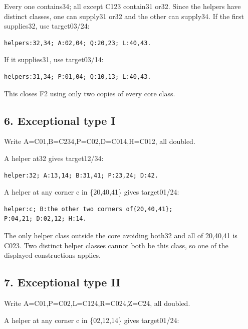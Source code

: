 \documentclass[
  10pt,
]{article}
\begin{document}
Every one contains34; all except C123 contain31 or32. Since the helpers
have distinct classes, one can supply31 or32 and the other can supply34.
If the first supplies32, use target03/24:

\begin{verbatim}
helpers:32,34; A:02,04; Q:20,23; L:40,43.
\end{verbatim}

If it supplies31, use target03/14:

\begin{verbatim}
helpers:31,34; P:01,04; Q:10,13; L:40,43.
\end{verbatim}

This closes F2 using only two copies of every core class.

\hypertarget{exceptional-type-i}{%
\subsection*{6. Exceptional type I}\label{exceptional-type-i}}

Write A=C01,B=C234,P=C02,D=C014,H=C012, all doubled.

A helper at32 gives target12/34:

\begin{verbatim}
helper:32; A:13,14; B:31,41; P:23,24; D:42.
\end{verbatim}

A helper at any corner c in \{20,40,41\} gives target01/24:

\begin{verbatim}
helper:c; B:the other two corners of{20,40,41};
P:04,21; D:02,12; H:14.
\end{verbatim}

The only helper class outside the core avoiding both32 and all of
20,40,41 is C023. Two distinct helper classes cannot both be this class,
so one of the displayed constructions applies.

\hypertarget{exceptional-type-ii}{%
\subsection*{7. Exceptional type II}\label{exceptional-type-ii}}

Write A=C01,P=C02,L=C124,R=C024,Z=C24, all doubled.

A helper at any corner c in \{02,12,14\} gives target01/24:
\end{document}
